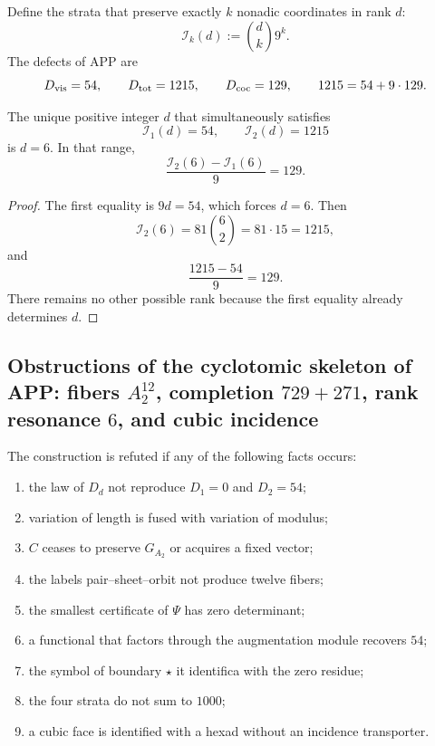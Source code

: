 Define the strata that preserve exactly \(k\) nonadic
coordinates in rank \(d\):
\[
 \mathcal I_k(d):=\binom dk9^k.
\]
The defects of APP are
\[
 D_{\rm vis}=54,
 \qquad
 D_{\rm tot}=1215,
 \qquad
 D_{\rm coc}=129,
 \qquad
 1215=54+9\cdot129.
\]

\begin{theorem}
\label{p12-83-c1-s5:thm:resonancia-binomial-autonoma}
The unique positive integer \(d\) that simultaneously satisfies
\[
 \mathcal I_1(d)=54,
 \qquad
 \mathcal I_2(d)=1215
\]
is \(d=6\). In that range,
\[
 \frac{\mathcal I_2(6)-\mathcal I_1(6)}9=129.
\]
\end{theorem}

\begin{proof}
The first equality is \(9d=54\), which forces \(d=6\). Then
\[
 \mathcal I_2(6)=81\binom62=81\cdot15=1215,
\]
and
\[
 \frac{1215-54}{9}=129.
\]
There remains no other possible rank because the first equality already determines \(d\).
\end{proof}

\subsection{Obstructions of the cyclotomic skeleton of APP: fibers \(A_2^{12}\), completion \(729+271\), rank resonance \(6\), and cubic incidence}

\begin{criterion}
The construction is refuted if any of the following facts occurs:
\begin{enumerate}
 \item the law of \(D_d\) not reproduce \(D_1=0\) and \(D_2=54\);
 \item variation of length is fused with variation of modulus;
 \item \(C\) ceases to preserve \(G_{A_2}\) or acquires a fixed vector;
 \item the labels pair--sheet--orbit not produce twelve fibers;
 \item the smallest certificate of \(\Psi\) has zero determinant;
 \item a functional that factors through the augmentation module recovers \(54\);
 \item the symbol of boundary \(\star\) it identifica with the zero residue;
 \item the four strata do not sum to \(1000\);
 \item a cubic face is identified with a hexad without an incidence
       transporter.
\end{enumerate}
\end{criterion}

